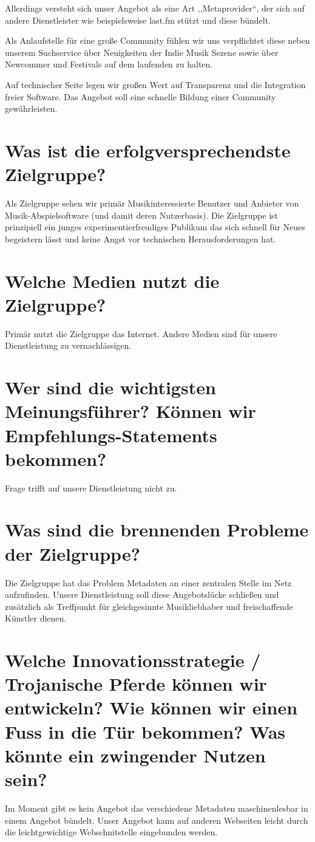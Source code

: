 \documentclass[11pt]{scrreprt}
\begin{document}
Allerdings versteht sich unser Angebot als eine Art ,,Metaprovider``, der sich
auf andere Dienstleister wie beispielsweise last.fm stützt und diese bündelt.

Als Anlaufstelle für eine große Community fühlen wir uns verpflichtet diese
neben unserem Suchservice über Neuigkeiten der Indie Musik Sezene sowie über
Newcommer und Festivals auf dem laufenden zu halten. 

Auf technischer Seite legen wir großen Wert auf Transparenz und die Integration
freier Software. Das Angebot soll eine schnelle Bildung einer Community
gewährleisten.



\section{Was ist die erfolgversprechendste Zielgruppe?}
Als Zielgruppe sehen wir primär Musikinteressierte Benutzer und Anbieter von
Musik-Abspielsoftware (und damit deren Nutzerbasis).
Die Zielgruppe ist prinzipiell ein junges experimentierfreudiges Publikum das
sich schnell für Neues begeistern lässt und keine Angst vor technischen Herausforderungen hat.


\section{Welche Medien nutzt die Zielgruppe?}
Primär nutzt die Zielgruppe das Internet. Andere Medien sind für unsere
Dienstleistung zu vernachlässigen.


\section{Wer sind die wichtigsten Meinungsführer?
Können wir Empfehlungs-Statements bekommen?}
Frage trifft auf unsere Dienstleistung nicht zu.



\section{Was sind die brennenden Probleme der
Zielgruppe?}
Die Zielgruppe hat das Problem Metadaten an einer zentralen Stelle im Netz
aufzufinden. Unsere Dienstleistung soll diese Angebotslücke schließen und
zusätzlich als Treffpunkt für gleichgesinnte Musikliebhaber und freischaffende
Künstler dienen.


\section{Welche Innovationsstrategie / Trojanische Pferde können wir entwickeln?
    Wie können wir einen Fuss in die Tür bekommen?
Was könnte ein zwingender Nutzen sein?}
Im Moment gibt es kein Angebot das verschiedene Metadaten maschinenlesbar 
in einem Angebot bündelt. Unser Angebot kann auf anderen Webseiten leicht durch
die leichtgewichtige Webschnitstelle eingebunden werden.
\end{document}
